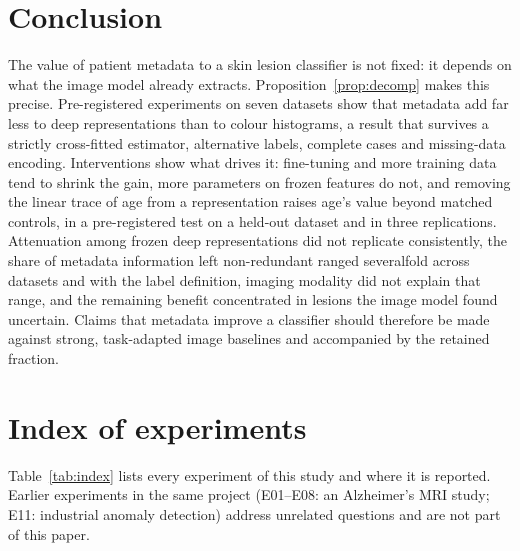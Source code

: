 \documentclass[conference]{IEEEtran}
\begin{document}
\section{Conclusion}
The value of patient metadata to a skin lesion classifier is not fixed: it depends on what the image model already extracts. Proposition~\ref{prop:decomp} makes this precise. Pre-registered experiments on seven datasets show that metadata add far less to deep representations than to colour histograms, a result that survives a strictly cross-fitted estimator, alternative labels, complete cases and missing-data encoding. Interventions show what drives it: fine-tuning and more training data tend to shrink the gain, more parameters on frozen features do not, and removing the linear trace of age from a representation raises age's value beyond matched controls, in a pre-registered test on a held-out dataset and in three replications. Attenuation among frozen deep representations did not replicate consistently, the share of metadata information left non-redundant ranged severalfold across datasets and with the label definition, imaging modality did not explain that range, and the remaining benefit concentrated in lesions the image model found uncertain. Claims that metadata improve a classifier should therefore be made against strong, task-adapted image baselines and accompanied by the retained fraction.

\appendices
\section{Index of experiments}\label{app:index}
Table~\ref{tab:index} lists every experiment of this study and where it is reported. Earlier experiments in the same project (E01--E08: an Alzheimer's MRI study; E11: industrial anomaly detection) address unrelated questions and are not part of this paper.
\end{document}
